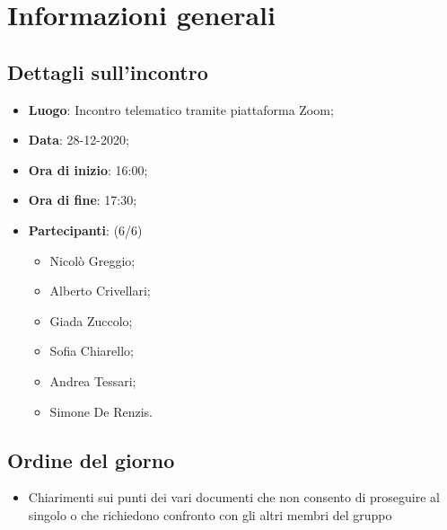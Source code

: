 \section{Informazioni generali}

\subsection{Dettagli sull'incontro}
\begin{itemize}
\item \textbf{Luogo}: Incontro telematico tramite piattaforma Zoom;
\item \textbf{Data}: 28-12-2020;
\item \textbf{Ora di inizio}: 16:00;
\item \textbf{Ora di fine}: 17:30;
\item \textbf{Partecipanti}: (6/6)
\begin{itemize}
	\item Nicolò Greggio;
	\item Alberto Crivellari;
	\item Giada Zuccolo;
	\item Sofia Chiarello;
	\item Andrea Tessari;
	\item Simone De Renzis.
\end{itemize}
\end{itemize}

\subsection{Ordine del giorno}
\begin{itemize}
	\item Chiarimenti sui punti dei vari documenti che non consento di proseguire al singolo o che richiedono confronto con gli altri membri del gruppo
\end{itemize}


